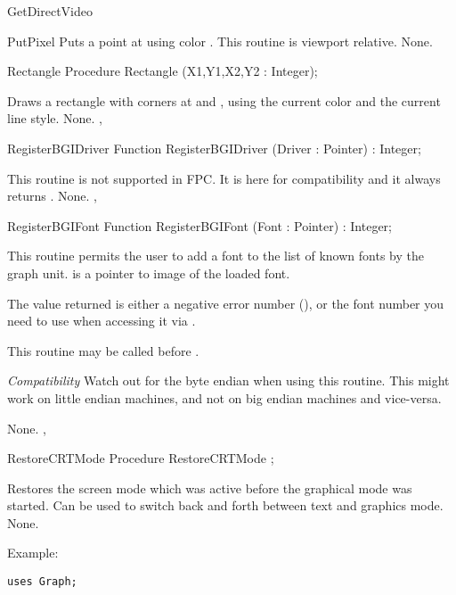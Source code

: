 \begin{function}{GetDirectVideo}
\begin{procedure}{PutPixel}
\Description
Puts a point at
 using color . This routine is viewport
relative.
\Errors
None.
\SeeAlso
{}
\end{procedure}
\begin{procedure}{Rectangle}
\Declaration
Procedure Rectangle (X1,Y1,X2,Y2 : Integer);

\Description
Draws a rectangle with
corners at  and , using the current color and
the current line style.
\Errors
None.
\SeeAlso
{}, 
\end{procedure}
\begin{function}{RegisterBGIDriver}
\Declaration
Function RegisterBGIDriver (Driver : Pointer) : Integer;

\Description
This routine is not supported in FPC. It is here for compatibility and it
always returns .
\Errors
None.
\SeeAlso
{},
\end{function}
\begin{function}{RegisterBGIFont}
\Declaration
Function RegisterBGIFont (Font : Pointer) : Integer;

\Description
This routine permits the user to add a font to the list of known fonts
by the graph unit.  is a pointer to image of the loaded font.

The value returned is either a negative error number (),
or the font number you need to use when accessing it via .

This routine may be called before .


\textit{Compatibility}
Watch out for the byte endian when using this routine. This might work
on little endian machines, and not on big endian machines and vice-versa.


\Errors
None.
\SeeAlso
{},
\end{function}
\begin{procedure}{RestoreCRTMode}
\Declaration
Procedure RestoreCRTMode ;

\Description
Restores the screen mode which was active before
the graphical mode was started. Can be used to switch back and forth
between text and graphics mode.
\Errors
None.
\SeeAlso
{}


\end{procedure}

Example:
\begin{verbatim}
uses Graph;


\end{verbatim}
\end{function}
